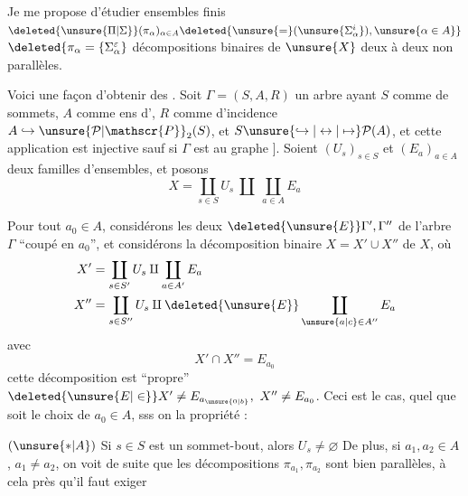 Je me propose d'étudier  ensembles finis  $\deleted{\unsure{\Pi|\Sigma}}(\pi_\alpha)_{\alpha\in A}\deleted{\unsure{=}(\unsure{\Sigma_\alpha^i}),\unsure{\alpha\in A}}$
$\deleted{\pi_\alpha=\{\Sigma_\alpha^\varepsilon}$  décompositions binaires de $\unsure{X}$ deux à deux non parallèles.

Voici une façon   d'obtenir des .
Soit  $\Gamma=(S,A,R)$ un arbre ayant $S$ comme  de sommets, $A$ \unsure{-} comme ens d', $R$ comme  d'incidence \unsure{[|E}
$A\hookrightarrow\unsure{\mathcal{P}|\mathscr{P}}_2(S)$, et $S\unsure{\hookrightarrow|\leftrightarrow|\mapsto}\mathcal{P}(A)$, et cette application est injective sauf si $\Gamma$ est  au graphe
\diagram{\begin{tikzcd}[ampersand replacement=\&,column sep=1.4em]
\bullet \arrow[r,dash] \& \bullet
\end{tikzcd}}
]. Soient $(U_s)_{s\in S}$ et $(E_a)_{a\in A}$ deux familles d'ensembles, et posons
\[
X=\coprod_{s\in S}U_s\ \amalg\ \coprod_{a\in A}E_a
\]

Pour tout $a_0\in A$, considérons les deux   $\deleted{\unsure{E}}\Gamma',\Gamma''$ de l'arbre $\Gamma$ ``coupé en $a_0$'', et considérons la décomposition binaire  $X=X'\cup X''$ de $X$,
où
\[
\begin{aligned}
X'&=\coprod_{s\in S'}U_s\amalg\coprod_{a\in A'}E_a\\
X''&=\coprod_{s\in S''}U_s\amalg\deleted{\unsure{E}}\coprod_{\unsure{a|c}\in A''}E_a
\end{aligned}
\]
avec
\[
X'\cap X''=E_{a_0}
\]
cette décomposition est ``propre''\  $\deleted{\unsure{E|\in}}X'\ne E_{a_{\unsure{0|b}}},\ X''\ne E_{a_0}$. Ceci est le cas, quel que soit le choix de $a_0\in A$, sss on  la propriété  :

$(\unsure{\ast|A})$ Si $s\in S$ est un sommet-bout, alors $U_s\ne\varnothing$
De plus, si $a_1,a_2\in A$, $a_1\ne a_2$, on voit de suite que les décompositions $\pi_{a_1},\pi_{a_2}$ sont bien parallèles, à cela près qu'il faut exiger %

